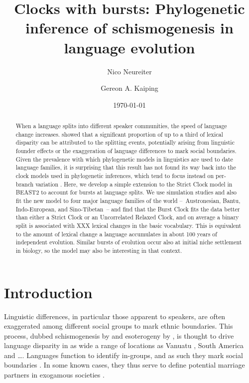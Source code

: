 \documentclass[a4paper,12pt]{scrartcl}
\title{Clocks with bursts: Phylogenetic inference of schismogenesis in language evolution}
\date{\today}
\author[1]{Nico Neureiter}
\author[1]{Gereon A. Kaiping}
\affil[1]{Geographic Information Science Center, Universität Zürich, CH}
\begin{document}
\maketitle
\begin{abstract}
When a language splits into different speaker communities, the speed of
language change increases. \Textcite{atkinson2008languages} showed that a
significant proportion of up to a third of lexical disparity can be attributed
to the splitting events, potentially arising from linguistic founder effects or
the exaggeration of language differences to mark social boundaries. Given the
prevalence with which phylogenetic models in linguistics are used to date
language families, it is surprising that this result has not found its way back
into the clock models used in phylogenetic inferences, which tend to focus
instead on per-branch variation \parencite{}. Here, we develop a simple
extension to the Strict Clock model \parencite{} in BEAST2 \parencite{} to
account for bursts at language splits. We use simulation studies and also fit
the new model to four major language families of the world –~Austronesian,
Bantu, Indo-European, and Sino-Tibetan~– and find that the Burst Clock fits the
data better than either a Strict Clock or an Uncorrelated Relaxed Clock, and on
average a binary split is associated with XXX lexical changes in the basic
vocabulary. This is equivalent to the amount of lexical change a language
accumulates in about 100 years of independent evolution. Similar bursts of evolution
occur also at initial niche settlement in biology, so the model may also be
interesting in that context.
\end{abstract}

\section{Introduction}

Linguistic differences, in particular those apparent to speakers, are often
exaggerated among different social groups to mark ethnic boundaries. This
process, dubbed schismogenesis by \textcite{bateson1935culture} and esoterogeny
by \textcite{thurston1987processes}, is thought to drive language disparity in
as wide a range of locations as Vanuatu \parencite{}, South America \parencite{}
and …. Languages function to identify in-groups, and as such they mark social
boundaries \parencite{labov1963social}. In some known cases, they thus serve to
define potential marriage partners in exogamous societies \parencite{}.
\end{document}
